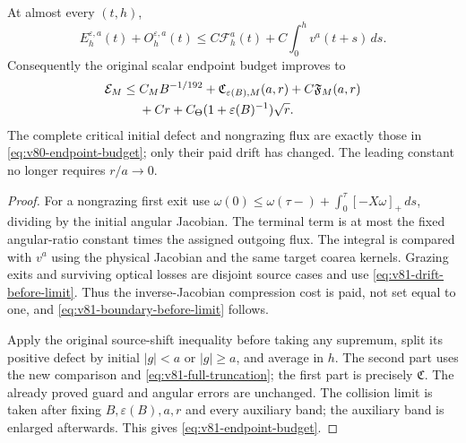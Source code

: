 \begin{theorem}
\label{thm:v81-boundary-height}
At almost every $(t,h)$,
\begin{equation}\label{eq:v81-boundary-before-limit}
 E_h^{\varepsilon,a}(t)+O_h^{\varepsilon,a}(t)
        \le C\mathcal F_h^a(t)+C\int_0^h v^a(t+s)\,ds.
\end{equation}
Consequently the original scalar endpoint budget improves to
\begin{align}
 \mathcal E_M\le{}&C_MB^{-1/192}
   +\mathfrak C_{\varepsilon(B),M}(a,r)+C\mathfrak F_M(a,r)
                                                       \notag\\
   &+Cr+C_\Theta(1+\varepsilon(B)^{-1})\sqrt r.
                                      \label{eq:v81-endpoint-budget}
\end{align}
The complete critical initial defect and nongrazing flux are exactly
those in \eqref{eq:v80-endpoint-budget}; only their paid drift has
changed. The leading constant no longer requires $r/a\to0$.
\end{theorem}
\begin{proof}
For a nongrazing first exit use
$\omega(0)\le\omega(\tau-)+\int_0^\tau[-X\omega]_+\,ds$,
dividing by the initial angular Jacobian. The terminal term is at
most the fixed angular-ratio constant times the assigned outgoing
flux. The integral is compared with $v^a$ using the physical
Jacobian and the same target coarea kernels. Grazing exits and
surviving optical losses are disjoint source cases and use
\eqref{eq:v81-drift-before-limit}. Thus the inverse-Jacobian
compression cost is paid, not set equal to one, and
\eqref{eq:v81-boundary-before-limit} follows.

Apply the original source-shift inequality before taking any
supremum, split its positive defect by initial $|g|<a$ or
$|g|\ge a$, and average in $h$. The second part uses the new
comparison and \eqref{eq:v81-full-truncation}; the first part is
precisely $\mathfrak C$. The already proved guard and angular
errors are unchanged. The collision limit is taken after fixing
$B,\varepsilon(B),a,r$ and every auxiliary band; the auxiliary band
is enlarged afterwards. This gives \eqref{eq:v81-endpoint-budget}.
\end{proof}

